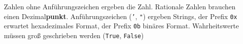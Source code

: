 Zahlen ohne Anführungszeichen ergeben die Zahl. Rationale Zahlen brauchen einen
Dezimal\textbf{punkt}. Anführungszeichen (\texttt{'}, \texttt{"}) ergeben Strings,
der Prefix \texttt{0x} erwartet hexadezimales Format, der Prefix \texttt{0b}
binäres Format. Wahrheitswerte müssen groß geschrieben werden (\texttt{True},
\texttt{False})
